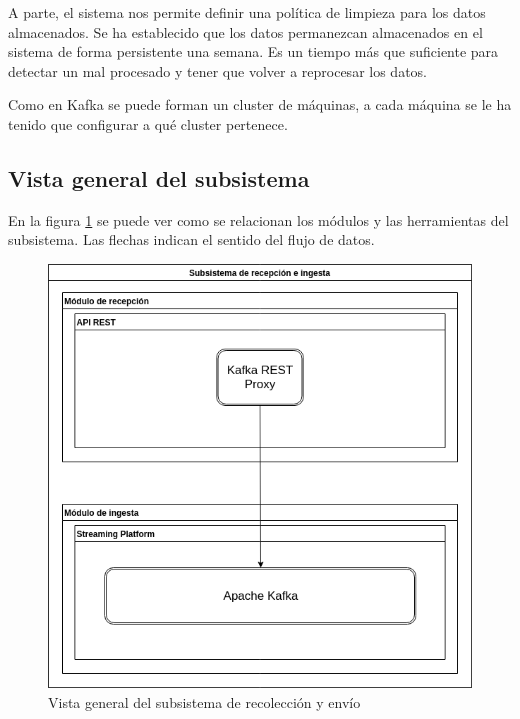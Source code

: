 A parte, el sistema nos permite definir una política de limpieza para los datos almacenados. Se ha establecido que los datos permanezcan almacenados en el sistema de forma persistente una semana. Es un tiempo más que suficiente para detectar un mal procesado y tener que volver a reprocesar los datos.

Como en Kafka se puede forman un cluster de máquinas, a cada máquina se le ha tenido que configurar a qué cluster pertenece.

\subsection{Vista general del subsistema}
En la figura \ref{fig:subrecing} se puede ver como se relacionan los módulos y las herramientas del subsistema. Las flechas indican el sentido del flujo de datos.

\begin{figure}
	\includegraphics[width=\linewidth]{Moduloss-subrecing.png}
	\caption{Vista general del subsistema de recolección y envío}
	\label{fig:subrecing}
\end{figure}

